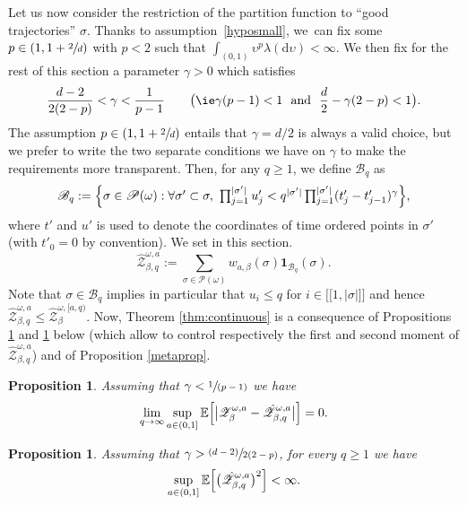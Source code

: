 \documentclass[JEP,XML,SOM,Unicode,published]{cedram}
\let\mathcal\mathscr
\let\sep:
\newcommand{\psfrac}[2]{\sfrac{(#1)}{#2}}
\newcommand{\spfrac}[2]{\sfrac{#1}{(#2)}}
\newcommand{\lint}{\mathopen{[\![}}
\newcommand{\rint}{\mathclose{]\!]}}
\newtheorem{proposition}[theorem]{Proposition}
\theoremstyle{definition}
\newcommand{\dd}{\mathrm{d}}
\newcommand{\ind}{\mathbf{1}}
\newcommand{\cB}{{\ensuremath{\mathcal B}} }
\newcommand{\cP}{{\ensuremath{\mathcal P}} }
\newcommand{\cZ}{{\ensuremath{\mathcal Z}} }
\newcommand{\bbE}{{\ensuremath{\mathbb E}} }
\let\ups\upsilon
\let\go\omega
\begin{document}
Let us now consider the restriction of the partition function to ``good trajectories'' $\sigma$.
Thanks to assumption~\eqref{hyposmall}, we~can fix some $p\in (1,1+\sfrac 2d)$ with $p<2$ such that $\int_{(0,1)} \ups^{p} \lambda(\dd \ups)<\infty$.
We then fix for the rest of this section a parameter $\gamma>0$ which satisfies
\begin{equation}
\label{lesdeuxconds}
\frac{d-2}{2(2-p)} < \gamma < \frac{1}{p-1} \qquad \bigl(\text{\ie}\gamma(p-1)<1 \ \text{ and } \ \frac d2 -\gamma(2-p) <1 \bigr).
\end{equation}
The assumption $p \in (1, 1+\sfrac 2d)$ entails that $\gamma=d/2$ is always a valid choice, but
we prefer to write the two separate conditions we have on $\gamma$ to make the requirements more transparent.
Then, for any $q \geq 1$, we define $ \cB_q$ as
\begin{equation}
\label{def:BNcont}\textstyle
\cB_q :=\Bigl\{ \sigma \in \cP(\go) \sep \forall \sigma'\subset \sigma, \ \prod_{j=1}^{|\sigma'|} u'_j < q^{|\sigma'|} \prod_{j=1}^{|\sigma'|} (t_j'-t_{j-1}')^{\gamma} \Bigr\},
\end{equation}
where $t'$ and $u'$ is used to denote the coordinates of time ordered points in $\sigma'$ (with $t'_0=0$ by convention).
We set in this section.
\begin{equation}
\hat \cZ^{\go,a}_{\beta,q}:= \sum_{\sigma \in \cP(\go)} w_{a,\beta}(\sigma) \ind_{ \cB_q}(\sigma).
\end{equation}
Note that $\sigma\in \cB_q$ implies in particular that $u_i\le q$ for $i\in \lint 1, |\sigma| \rint$ and hence $\hat \cZ^{\go,a}_{\beta,q}\le \hat \cZ^{\go,[a,q)}_{\beta}$.
Now, Theorem \ref{thm:continuous} is a consequence of Propositions \ref{lesper} and \ref{llavar} below (which allow to control respectively the first and second moment of $\hat \cZ^{\go,a}_{\beta,q}$) and of Proposition \ref{metaprop}.

\begin{proposition}\label{lesper}
Assuming that $\gamma < \spfrac{1}{p-1}$ we have
\begin{equation}\label{unif1}
\lim_{q \to \infty} \sup_{a\in(0,1]} \bbE \Bigl[ \big| \cZ^{\go,a}_{\beta}- \hat \cZ^{\go,a}_{\beta,q} \big| \Bigr]=0.
\end{equation}
\end{proposition}

\begin{proposition}\label{llavar}
Assuming that $\gamma>\psfrac{d-2}{2(2-p)}$,
for every $q\ge 1$ we have
\begin{equation}\label{unif2}
\sup_{a\in(0,1]} \bbE \Bigl[ \bigl(\hat \cZ^{\go,a}_{\beta,q} \bigr)^2 \Bigr]<\infty.
\end{equation}
\end{proposition}
\end{document}
